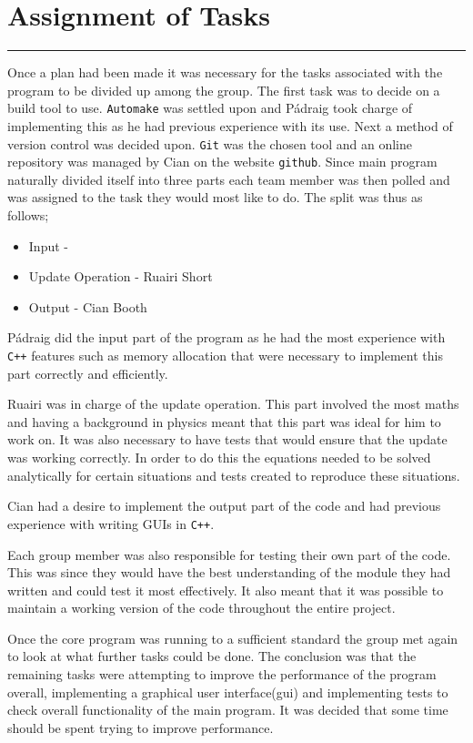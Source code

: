 \section{Assignment of Tasks}
\vspace{-2em}\rule{\textwidth}{1pt}\vspace{1em}

Once a plan had been made it was necessary for the tasks associated with the program to be divided up among the group.
The first task was to decide on a build tool to use.
\texttt{Automake} was settled upon and P\'{a}draig took charge of implementing this as he had previous experience with its use.
Next a method of version control was decided upon.
\texttt{Git} was the chosen tool and an online repository was managed by Cian on the website \texttt{github}.
Since main program naturally divided itself into three parts each team member was then polled and was assigned to the task they would most like to do.
The split was thus as follows;
\begin{itemize}
\item Input - \pa
\item Update Operation - Ruairi Short
\item Output - Cian Booth
\end{itemize}

P\'{a}draig did the input part of the program as he had the most experience with \texttt{C++} features such as memory allocation that were necessary to implement this part correctly and efficiently.

Ruairi was in charge of the update operation.
This part involved the most maths and having a background in physics meant that this part was ideal for him to work on.
It was also necessary to have tests that would ensure that the update was working correctly.
In order to do this the equations needed to be solved analytically for certain situations and tests created to reproduce these situations.

Cian had a desire to implement the output part of the code and had previous experience with writing GUIs in \texttt{C++}.

Each group member was also responsible for testing their own part of the code.
This was since they would have the best understanding of the module they had written and could test it most effectively.
It also meant that it was possible to maintain a working version of the code throughout the entire project.

Once the core program was running to a sufficient standard the group met again to look at what further tasks could be done.
The conclusion was that the remaining tasks were attempting to improve the performance of the program overall, implementing a graphical user interface(gui) and implementing tests to check overall functionality of the main program.
It was decided that some time should be spent trying to improve performance.

